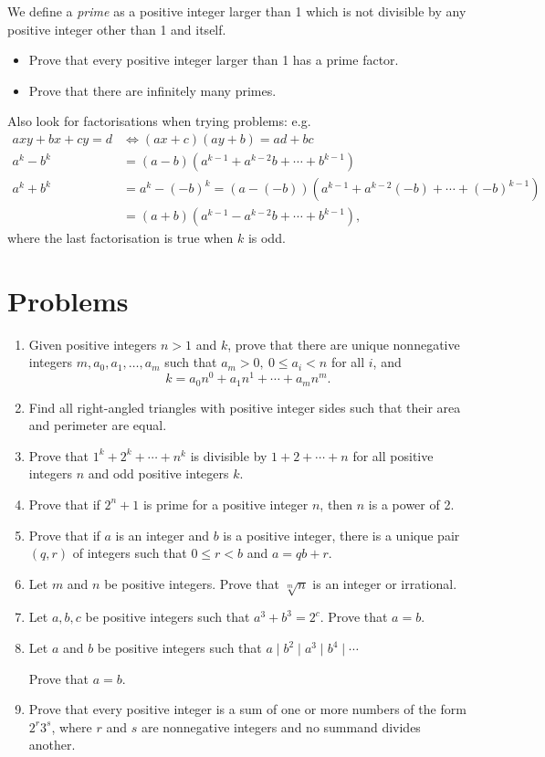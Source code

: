 \documentclass{article}
\begin{document}
  We define a \emph{prime} as a positive integer larger than 1 which is not
  divisible by any positive integer other than 1 and itself.
  \begin{itemize}
    \item Prove that every positive integer larger than 1 has a prime factor.
    \item Prove that there are infinitely many primes.
  \end{itemize}
Also look for factorisations when trying problems: e.g.
\begin{align*}
  axy+bx+cy=d&\iff (ax+c)(ay+b)=ad+bc \\
  a^k-b^k&=(a-b)\left(a^{k-1}+a^{k-2}b+\cdots+b^{k-1}\right) \\
  a^k+b^k&=a^k-(-b)^k=(a-(-b))(a^{k-1}+a^{k-2}(-b)+\cdots+(-b)^{k-1}) \\
  &=(a+b)(a^{k-1}-a^{k-2}b+\cdots+b^{k-1}),
\end{align*}
where the last factorisation is true when $k$ is odd.
\section{Problems}
  \begin{enumerate}
    \item Given positive integers $n>1$ and $k$, prove that there are unique
      nonnegative integers $m,a_0,a_1,\ldots,a_m$ such that $a_m>0,\ 0\le
      a_i<n$ for all $i$, and
      \[k=a_0 n^0+a_1 n^1+\cdots+a_m n^m.\]
    \item Find all right-angled triangles with positive integer sides 
      such that their area and perimeter are equal.
    \item Prove that $1^k+2^k+\cdots+n^k$ is divisible by $1+2+\cdots+n$ for
      all positive integers $n$ and odd positive integers $k$.
    \item Prove that if $2^n+1$ is prime for a positive integer $n$, then $n$ is
      a power of 2.
    \item Prove that if $a$ is an integer and $b$ is a positive integer, there
      is a unique pair $(q,r)$ of integers such that $0\le r<b$ and $a=qb+r$.
    \item Let $m$ and $n$ be positive integers. Prove that $\sqrt[m]n$ is an
      integer or irrational.
    \item Let $a,b,c$ be positive integers such that $a^3+b^3=2^c$. Prove that
      $a=b$.
    \item Let $a$ and $b$ be positive integers such that $a\mid b^2\mid a^3\mid
      b^4\mid\cdots$

      Prove that $a=b$.
    \item Prove that every positive integer is a sum of one or more numbers of
      the form $2^r3^s$, where $r$ and $s$ are nonnegative integers and no
      summand divides another.
  \end{enumerate}
\newpage
\end{document}
